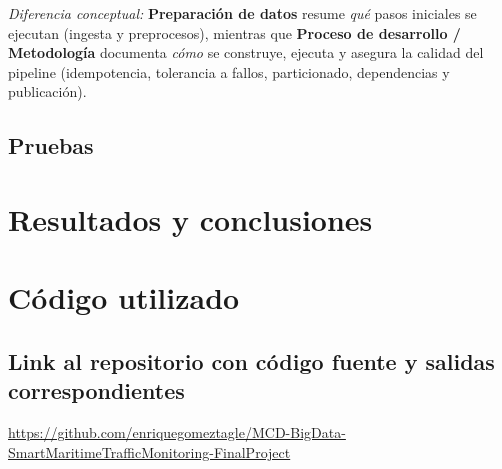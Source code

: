 \documentclass[10pt]{article}
\begin{document}
\noindent\textit{Diferencia conceptual:} \textbf{Preparación de datos} resume \emph{qué} pasos iniciales se ejecutan (ingesta y preprocesos), mientras que \textbf{Proceso de desarrollo / Metodología} documenta \emph{cómo} se construye, ejecuta y asegura la calidad del pipeline (idempotencia, tolerancia a fallos, particionado, dependencias y publicación).

\subsection{Pruebas} %
\section{Resultados y conclusiones} %
\section{Código utilizado} %
\subsection{Link al repositorio con código fuente y salidas correspondientes}
\url{https://github.com/enriquegomeztagle/MCD-BigData-SmartMaritimeTrafficMonitoring-FinalProject}
\end{document}

